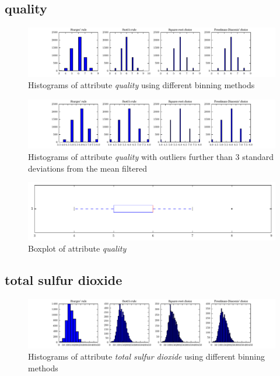 \documentclass{report}
\begin{document}
\newpage\subsection{quality}
\begin{figure}[H]
\includegraphics[width=\textwidth]{histograms/quality.pdf}
\caption{Histograms of attribute \emph{quality} using different binning methods}\end{figure}

\begin{figure}[H]
\includegraphics[width=\textwidth]{histograms/quality_filtered.pdf}
\caption{Histograms of attribute \emph{quality} with outliers further than 3 standard deviations from the mean filtered}
\end{figure}

\begin{figure}[H]
\includegraphics[width=\textwidth]{boxplots/quality.pdf}
\caption{Boxplot of attribute \emph{quality}}\end{figure}

\newpage\subsection{total sulfur dioxide}
\begin{figure}[H]
\includegraphics[width=\textwidth]{histograms/total_sulfur_dioxide.pdf}
\caption{Histograms of attribute \emph{total sulfur dioxide} using different binning methods}\end{figure}
\end{document}
